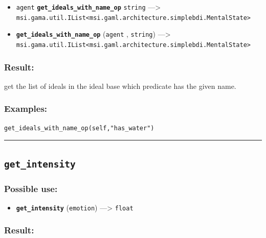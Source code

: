 \documentclass[]{book}
\providecommand{\tightlist}{%
  \setlength{\itemsep}{0pt}\setlength{\parskip}{0pt}}
\theoremstyle{definition}
\theoremstyle{definition}
\theoremstyle{definition}
\theoremstyle{remark}
\begin{document}
\begin{itemize}
\tightlist
\item
  \texttt{agent} \textbf{\texttt{get\_ideals\_with\_name\_op}}
  \texttt{string} ---\textgreater{}
  \texttt{msi.gama.util.IList\textless{}msi.gaml.architecture.simplebdi.MentalState\textgreater{}}
\item
  \textbf{\texttt{get\_ideals\_with\_name\_op}} (\texttt{agent} ,
  \texttt{string}) ---\textgreater{}
  \texttt{msi.gama.util.IList\textless{}msi.gaml.architecture.simplebdi.MentalState\textgreater{}}
\end{itemize}

\subsubsection{Result:}\label{result-206}

get the list of ideals in the ideal base which predicate has the given
name.

\subsubsection{Examples:}\label{examples-159}

\begin{verbatim}
get_ideals_with_name_op(self,"has_water") 
\end{verbatim}

\begin{center}\rule{0.5\linewidth}{\linethickness}\end{center}

\subsection{\texorpdfstring{\texttt{get\_intensity}}{get\_intensity}}\label{get_intensity}

\subsubsection{Possible use:}\label{possible-use-213}

\begin{itemize}
\tightlist
\item
  \textbf{\texttt{get\_intensity}} (\texttt{emotion}) ---\textgreater{}
  \texttt{float}
\end{itemize}

\subsubsection{Result:}\label{result-207}
\end{document}
